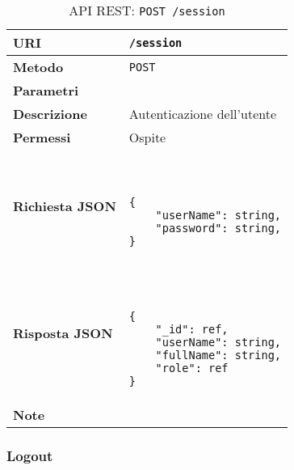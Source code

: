        \begin{table}[H]
            \begin{center}
                \begin{tabular}{p{} p{}}
                    \toprule
                    \textbf{URI} & \texttt{/session} \\ \midrule
                    \textbf{Metodo} & \texttt{POST} \\ \midrule
                    \textbf{Parametri} & \\ \midrule
                    \textbf{Descrizione} & Autenticazione dell'utente \\ \midrule
                    \textbf{Permessi} & Ospite \\ \midrule
                    \textbf{Richiesta JSON} & \
                        \begin{lstlisting}[basicstyle={\ttfamily}]
{
    "userName": string,
    "password": string,
}
                        \end{lstlisting}
                        \\ \midrule
                    \textbf{Risposta JSON} & \
                        \begin{lstlisting}[basicstyle={\ttfamily}]
{
	"_id": ref,
	"userName": string,
	"fullName": string,
	"role": ref
}
                        \end{lstlisting}
                    	\\ \midrule
                    \textbf{Note} & \\
                    \bottomrule
                \end{tabular}
                \caption{API REST: \texttt{POST /session}}
            \end{center}
        \end{table}

    \subsubsection{Logout}

